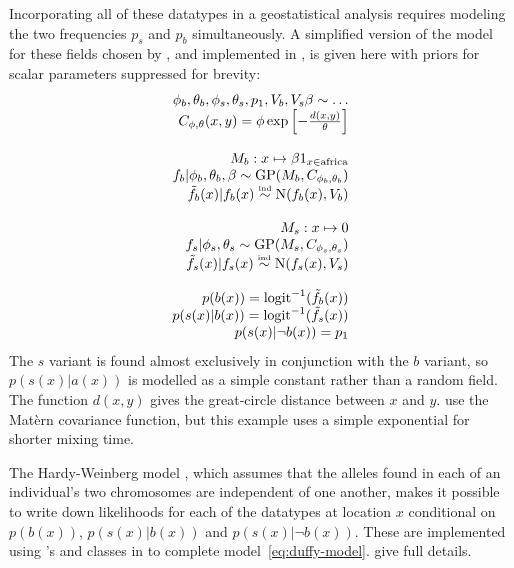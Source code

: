 \documentclass[article]{jss}
\begin{document}
Incorporating all of these datatypes in a geostatistical analysis requires modeling the two frequencies $p_s$ and $p_b$ simultaneously. A simplified version of the model for these fields chosen by \cite{Howes}, and implemented in , is given here with priors for scalar parameters suppressed for brevity:
\begin{equation}
    \label{eq:duffy-model} 
    \begin{array}{r}
        \phi_b,\theta_b,\phi_s,\theta_s,p_1,V_b,V_s\beta\sim\ldots\\
        C_{\phi,\theta}(x,y)=\phi\exp\left[{-\frac{d(x,y)}{\theta}}\right]\\\\
        M_b : x\mapsto \beta1_{x\in \textup{africa} }\\
        f_b|\phi_b,\theta_b,\beta\sim \textup{GP}(M_b, C_{\phi_b,\theta_b}) \\
        \tilde f_b(x) | f_b(x) \stackrel{\textup{\tiny ind}}{\sim} \textup{N}(f_b(x),V_b) \\\\
        M_s : x\mapsto 0\\
        f_s|\phi_s,\theta_s\sim \textup{GP}(M_s, C_{\phi_s,\theta_s})\\
        \tilde f_s(x) | f_s(x) \stackrel{\textup{\tiny ind}}{\sim} \textup{N}(f_s(x),V_s)\\\\
        p(b(x)) = \textup{logit}^{-1}(\tilde f_b(x))\\
        p(s(x)|b(x))= \textup{logit}^{-1}(\tilde f_s(x))\\
        p(s(x)|\neg b(x))= p_1
    \end{array}
\end{equation}  
The $s$ variant is found almost exclusively in conjunction with the $b$ variant, so $p(s(x)|a(x))$ is modelled as a simple constant rather than a random field. The function $d(x,y)$ gives the great-circle distance between $x$ and $y$. \cite{Howes} use the Mat\`ern covariance function, but this example uses a simple exponential for shorter mixing time. 

The Hardy-Weinberg model \citep{hardy-weinberg}, which assumes that the alleles found in each of an individual's two chromosomes are independent of one another, makes it possible to write down likelihoods for each of the datatypes at location $x$ conditional on $p(b(x))$, $p(s(x)|b(x))$ and $p(s(x)|\neg b(x))$. These are implemented using 's  and  classes in  to complete model~\ref{eq:duffy-model}. \cite{Howes} give full details.
\end{document}
